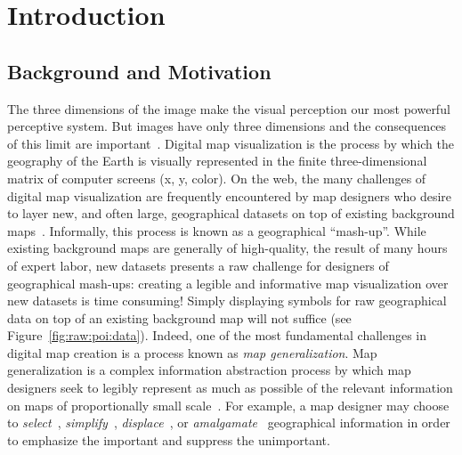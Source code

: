 \documentclass[11pt, oneside]{report}
\begin{document}
{%



\chapter{Introduction}
\label{chapter:introduction}

\section{Background and Motivation}
\label{sec:introduction:background:and:motivation}
The three dimensions of the image make the visual perception our most powerful perceptive system. But images have only three dimensions and the consequences of this limit are important~\cite{bertin1973semiologie}. Digital map visualization is the process by which the geography of the Earth is visually represented in the finite three-dimensional matrix of computer screens (x, y, color). On the web, the many challenges of digital map visualization are frequently encountered by map designers who desire to layer new, and often large, geographical datasets on top of existing background maps~\cite{googlemaps, bingmaps}. Informally, this process is known as a geographical ``mash-up''. While existing background maps are generally of high-quality, the result of many hours of expert labor, new datasets presents a raw challenge for designers of geographical mash-ups: creating a legible and informative map visualization over new datasets is time consuming! Simply displaying symbols for raw geographical data on top of an existing background map will not suffice (see Figure~\ref{fig:raw:poi:data}). Indeed, one of the most fundamental challenges in digital map creation is a process known as \emph{map generalization}. Map generalization is a complex information abstraction process by which map designers seek to legibly represent as much as possible of the relevant information on maps of proportionally small scale~\cite{weibel1999generalising}. For example, a map designer may choose to \emph{select}~\cite{topfer1966principles}, \emph{simplify}~\cite{douglas1973algorithms},  \emph{displace}~\cite{lonergan2001iterative}, or \emph{amalgamate}~\cite{haunert2006landcover} geographical information in order to emphasize the important and suppress the unimportant.

}
\end{document}
